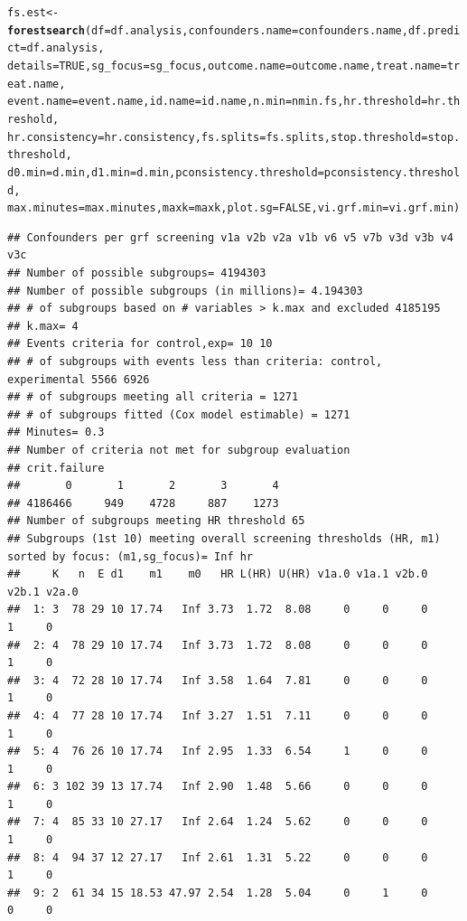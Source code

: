 \documentclass[9pt]{article}\usepackage[]{graphicx}\usepackage[]{xcolor}
\makeatletter
\newcommand{\hlnum}[1]{\textcolor[rgb]{0.686,0.059,0.569}{#1}}%
\newcommand{\hlstd}[1]{\textcolor[rgb]{0.345,0.345,0.345}{#1}}%
\newcommand{\hlkwb}[1]{\textcolor[rgb]{0.69,0.353,0.396}{#1}}%
\newcommand{\hlkwc}[1]{\textcolor[rgb]{0.333,0.667,0.333}{#1}}%
\newcommand{\hlkwd}[1]{\textcolor[rgb]{0.737,0.353,0.396}{\textbf{#1}}}%
\newenvironment{kframe}{%
 \def\at@end@of@kframe{}%
 \ifinner\ifhmode%
  \def\at@end@of@kframe{\end{minipage}}%
  \begin{minipage}{\columnwidth}%
 \fi\fi%
 \def\FrameCommand##1{\hskip\@totalleftmargin \hskip-\fboxsep
 \colorbox{shadecolor}{##1}\hskip-\fboxsep
     \hskip-\linewidth \hskip-\@totalleftmargin \hskip\columnwidth}%
 \MakeFramed {\advance\hsize-\width
   \@totalleftmargin\z@ \linewidth\hsize
   \@setminipage}}%
 {\par\unskip\endMakeFramed%
 \at@end@of@kframe}
\newenvironment{knitrout}{}{} %
\theoremstyle{definition}
\theoremstyle{remark}
\makeatother
\begin{document}
\begin{knitrout}
\begin{kframe}
\begin{alltt}
\hlstd{fs.est} \hlkwb{<-} \hlkwd{forestsearch}\hlstd{(}\hlkwc{df} \hlstd{= df.analysis,} \hlkwc{confounders.name} \hlstd{= confounders.name,} \hlkwc{df.predict} \hlstd{= df.analysis,}
    \hlkwc{details} \hlstd{=} \hlnum{TRUE}\hlstd{,} \hlkwc{sg_focus} \hlstd{= sg_focus,} \hlkwc{outcome.name} \hlstd{= outcome.name,} \hlkwc{treat.name} \hlstd{= treat.name,}
    \hlkwc{event.name} \hlstd{= event.name,} \hlkwc{id.name} \hlstd{= id.name,} \hlkwc{n.min} \hlstd{= nmin.fs,} \hlkwc{hr.threshold} \hlstd{= hr.threshold,}
    \hlkwc{hr.consistency} \hlstd{= hr.consistency,} \hlkwc{fs.splits} \hlstd{= fs.splits,} \hlkwc{stop.threshold} \hlstd{= stop.threshold,}
    \hlkwc{d0.min} \hlstd{= d.min,} \hlkwc{d1.min} \hlstd{= d.min,} \hlkwc{pconsistency.threshold} \hlstd{= pconsistency.threshold,}
    \hlkwc{max.minutes} \hlstd{= max.minutes,} \hlkwc{maxk} \hlstd{= maxk,} \hlkwc{plot.sg} \hlstd{=} \hlnum{FALSE}\hlstd{,} \hlkwc{vi.grf.min} \hlstd{= vi.grf.min)}
\end{alltt}
\begin{verbatim}
## Confounders per grf screening v1a v2b v2a v1b v6 v5 v7b v3d v3b v4 v3c 
## Number of possible subgroups= 4194303 
## Number of possible subgroups (in millions)= 4.194303 
## # of subgroups based on # variables > k.max and excluded 4185195 
## k.max= 4 
## Events criteria for control,exp= 10 10 
## # of subgroups with events less than criteria: control, experimental 5566 6926 
## # of subgroups meeting all criteria = 1271 
## # of subgroups fitted (Cox model estimable) = 1271 
## Minutes= 0.3 
## Number of criteria not met for subgroup evaluation 
## crit.failure
##       0       1       2       3       4 
## 4186466     949    4728     887    1273 
## Number of subgroups meeting HR threshold 65 
## Subgroups (1st 10) meeting overall screening thresholds (HR, m1) sorted by focus: (m1,sg_focus)= Inf hr 
##     K   n  E d1    m1    m0   HR L(HR) U(HR) v1a.0 v1a.1 v2b.0 v2b.1 v2a.0
##  1: 3  78 29 10 17.74   Inf 3.73  1.72  8.08     0     0     0     1     0
##  2: 4  78 29 10 17.74   Inf 3.73  1.72  8.08     0     0     0     1     0
##  3: 4  72 28 10 17.74   Inf 3.58  1.64  7.81     0     0     0     1     0
##  4: 4  77 28 10 17.74   Inf 3.27  1.51  7.11     0     0     0     1     0
##  5: 4  76 26 10 17.74   Inf 2.95  1.33  6.54     1     0     0     1     0
##  6: 3 102 39 13 17.74   Inf 2.90  1.48  5.66     0     0     0     1     0
##  7: 4  85 33 10 27.17   Inf 2.64  1.24  5.62     0     0     0     1     0
##  8: 4  94 37 12 27.17   Inf 2.61  1.31  5.22     0     0     0     1     0
##  9: 2  61 34 15 18.53 47.97 2.54  1.28  5.04     0     1     0     0     0

\end{verbatim}
\end{kframe}
\end{knitrout}
\end{document}
